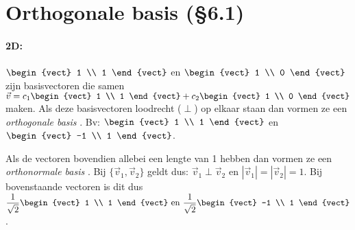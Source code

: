 \section{Orthogonale basis (\S6.1)}
\paragraph{2D:} $\begin{vect} 1 \\ 1 \end{vect}$ en $\begin{vect} 1 \\ 0 \end{vect}$ zijn basisvectoren die samen $\vec{v} = c_1 \begin{vect} 1 \\ 1 \end{vect} + c_2 \begin{vect} 1 \\ 0 \end{vect}$ maken. Als deze basisvectoren loodrecht ($\perp$) op elkaar staan dan vormen ze een \emph{orthogonale basis} . Bv: $\begin{vect} 1 \\ 1 \end{vect}$ en $\begin{vect} -1 \\ 1 \end{vect}$. 

Als de vectoren bovendien allebei een lengte van 1 hebben dan vormen ze een \emph{orthonormale basis} . Bij $\{ \vec{v}_1, \vec{v}_2 \}$ geldt dus: $\vec{v}_1 \perp \vec{v}_2$ en $|\vec{v}_1| = |\vec{v}_2| = 1$. Bij bovenstaande vectoren is dit dus $\displaystyle \frac{1}{\sqrt{2}} \begin{vect} 1 \\ 1 \end{vect} \mbox{ en } \frac{1}{\sqrt{2}} \begin{vect} -1 \\ 1 \end{vect}$.

